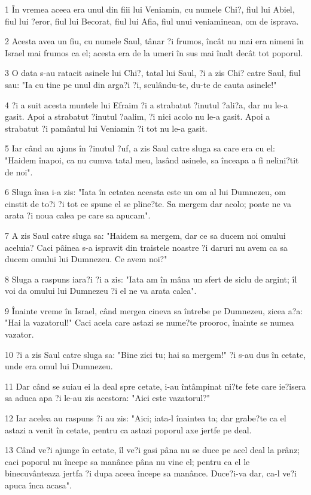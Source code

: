 \par 1 În vremea aceea era unul din fiii lui Veniamin, cu numele Chi?, fiul lui Abiel, fiul lui ?eror, fiul lui Becorat, fiul lui Afia, fiul unui veniaminean, om de isprava.
\par 2 Acesta avea un fiu, cu numele Saul, tânar ?i frumos, încât nu mai era nimeni în Israel mai frumos ca el; acesta era de la umeri în sus mai înalt decât tot poporul.
\par 3 O data s-au ratacit asinele lui Chi?, tatal lui Saul, ?i a zis Chi? catre Saul, fiul sau: "Ia cu tine pe unul din arga?i ?i, sculându-te, du-te de cauta asinele!"
\par 4 ?i a suit acesta muntele lui Efraim ?i a strabatut ?inutul ?ali?a, dar nu le-a gasit. Apoi a strabatut ?inutul ?aalim, ?i nici acolo nu le-a gasit. Apoi a strabatut ?i pamântul lui Veniamin ?i tot nu le-a gasit.
\par 5 Iar când au ajuns în ?inutul ?uf, a zis Saul catre sluga sa care era cu el: "Haidem înapoi, ca nu cumva tatal meu, lasând asinele, sa înceapa a fi nelini?tit de noi".
\par 6 Sluga însa i-a zis: "Iata în cetatea aceasta este un om al lui Dumnezeu, om cinstit de to?i ?i tot ce spune el se pline?te. Sa mergem dar acolo; poate ne va arata ?i noua calea pe care sa apucam".
\par 7 A zis Saul catre sluga sa: "Haidem sa mergem, dar ce sa ducem noi omului aceluia? Caci pâinea s-a ispravit din traistele noastre ?i daruri nu avem ca sa ducem omului lui Dumnezeu. Ce avem noi?"
\par 8 Sluga a raspuns iara?i ?i a zis: "Iata am în mâna un sfert de siclu de argint; îl voi da omului lui Dumnezeu ?i el ne va arata calea".
\par 9 Înainte vreme în Israel, când mergea cineva sa întrebe pe Dumnezeu, zicea a?a: "Hai la vazatorul!" Caci acela care astazi se nume?te prooroc, înainte se numea vazator.
\par 10 ?i a zis Saul catre sluga sa: "Bine zici tu; hai sa mergem!" ?i s-au dus în cetate, unde era omul lui Dumnezeu.
\par 11 Dar când se suiau ei la deal spre cetate, i-au întâmpinat ni?te fete care ie?isera sa aduca apa ?i le-au zis acestora: "Aici este vazatorul?"
\par 12 Iar acelea au raspuns ?i au zis: "Aici; iata-l înaintea ta; dar grabe?te ca el astazi a venit în cetate, pentru ca astazi poporul axe jertfe pe deal.
\par 13 Când ve?i ajunge în cetate, îl ve?i gasi pâna nu se duce pe acel deal la prânz; caci poporul nu începe sa manânce pâna nu vine el; pentru ca el le binecuvânteaza jertfa ?i dupa aceea începe sa manânce. Duce?i-va dar, ca-l ve?i apuca înca acasa".
